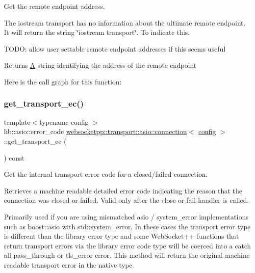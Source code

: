 Get the remote endpoint address. 

The iostream transport has no information about the ultimate remote endpoint. It will return the string \char`\"{}iostream transport\char`\"{}. To indicate this.

T\+O\+DO\+: allow user settable remote endpoint addresses if this seems useful

\begin{DoxyReturn}{Returns}
\mbox{\hyperlink{struct_a}{A}} string identifying the address of the remote endpoint 
\end{DoxyReturn}
Here is the call graph for this function\+:
\mbox{\label{classwebsocketpp_1_1transport_1_1asio_1_1connection_a8394f160cb79d081ff5d10d355bacf1a}} 
\subsubsection{\texorpdfstring{get\+\_\+transport\+\_\+ec()}{get\_transport\_ec()}}
{\footnotesize\ttfamily template$<$typename config $>$ \\
lib\+::asio\+::error\+\_\+code \mbox{\hyperlink{classwebsocketpp_1_1transport_1_1asio_1_1connection}{websocketpp\+::transport\+::asio\+::connection}}$<$ \mbox{\hyperlink{classconfig}{config}} $>$\+::get\+\_\+transport\+\_\+ec (\begin{DoxyParamCaption}{ }\end{DoxyParamCaption}) const\hspace{0.3cm}{\ttfamily [inline]}}



Get the internal transport error code for a closed/failed connection. 

Retrieves a machine readable detailed error code indicating the reason that the connection was closed or failed. Valid only after the close or fail handler is called.

Primarily used if you are using mismatched asio / system\+\_\+error implementations such as {\ttfamily boost\+::asio} with {\ttfamily std\+::system\+\_\+error}. In these cases the transport error type is different than the library error type and some Web\+Socket++ functions that return transport errors via the library error code type will be coerced into a catch all {\ttfamily pass\+\_\+through} or {\ttfamily tls\+\_\+error} error. This method will return the original machine readable transport error in the native type.

